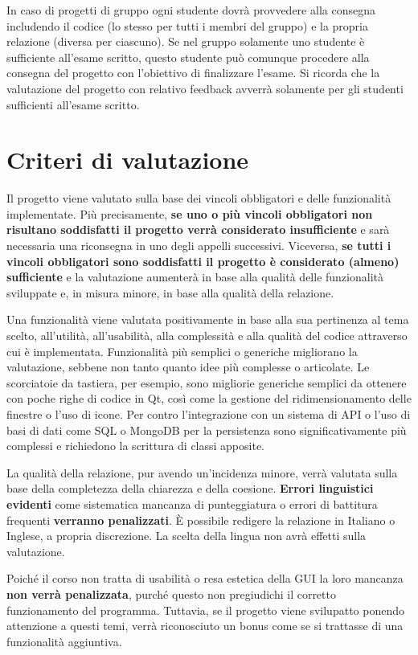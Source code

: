 \documentclass[10pt,a4paper,oneside]{article}
\begin{document}
In caso di progetti di gruppo ogni studente dovrà provvedere alla consegna includendo il codice (lo stesso per tutti i membri del gruppo) e la propria relazione (diversa per ciascuno). Se nel gruppo solamente uno studente è sufficiente all'esame scritto, questo studente può comunque procedere alla consegna del progetto con l'obiettivo di finalizzare l'esame. Si ricorda che la valutazione del progetto con relativo feedback avverrà solamente per gli studenti sufficienti all'esame scritto.


\section{Criteri di valutazione}
Il progetto viene valutato sulla base dei vincoli obbligatori e delle funzionalità implementate. Più precisamente, \textbf{se uno o più vincoli obbligatori non risultano soddisfatti il progetto verrà considerato insufficiente} e sarà necessaria una riconsegna in uno degli appelli successivi. Viceversa, \textbf{se tutti i vincoli obbligatori sono soddisfatti il progetto è considerato (almeno) sufficiente} e la valutazione aumenterà in base alla qualità delle funzionalità sviluppate e, in misura minore, in base alla qualità della relazione.

Una funzionalità viene valutata positivamente in base alla sua pertinenza al tema scelto, all'utilità, all'usabilità, alla complessità e alla qualità del codice attraverso cui è implementata. Funzionalità più semplici o generiche migliorano la valutazione, sebbene non tanto quanto idee più complesse o articolate. Le scorciatoie da tastiera, per esempio, sono migliorie generiche semplici da ottenere con poche righe di codice in Qt, così come la gestione del ridimensionamento delle finestre o l'uso di icone. Per contro l'integrazione con un sistema di API o l'uso di basi di dati come SQL o MongoDB per la persistenza sono significativamente più complessi e richiedono la scrittura di classi apposite.

La qualità della relazione, pur avendo un'incidenza minore, verrà valutata sulla base della completezza della chiarezza e della coesione. \textbf{Errori linguistici evidenti} come sistematica mancanza di punteggiatura o errori di battitura frequenti \textbf{verranno penalizzati}. È possibile redigere la relazione in Italiano o Inglese, a propria discrezione. La scelta della lingua non avrà effetti sulla valutazione.

Poiché il corso non tratta di usabilità o resa estetica della GUI la loro mancanza \textbf{non verrà penalizzata}, purché questo non pregiudichi il corretto funzionamento del programma. Tuttavia, se il progetto viene svilupatto ponendo attenzione a questi temi, verrà riconosciuto un bonus come se si trattasse di una funzionalità aggiuntiva.
\end{document}
